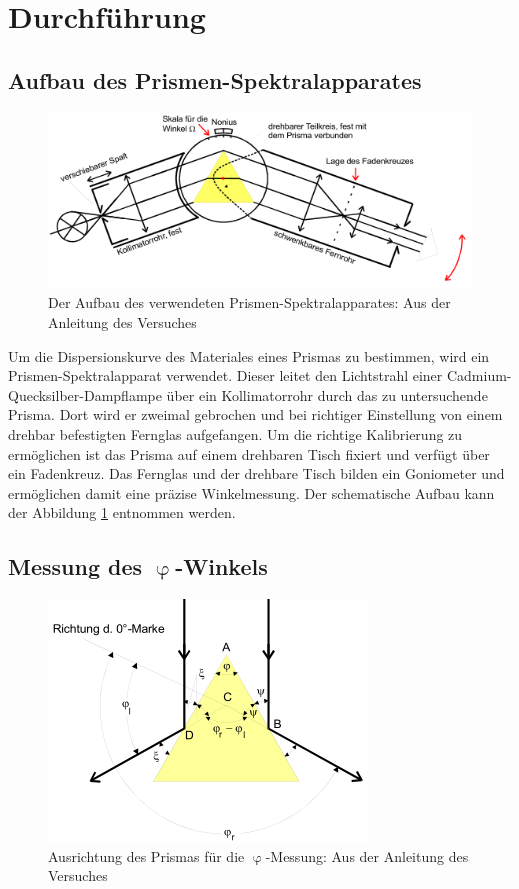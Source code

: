 \section{Durchführung}
\label{sec:Durchführung}
\subsection{Aufbau des Prismen-Spektralapparates}

\begin{figure}
  \centering
  \includegraphics[scale=0.7]{images/Aufbau.png}
  \caption{Der Aufbau des verwendeten Prismen-Spektralapparates: Aus der Anleitung des Versuches \cite[24]{1}}
  \label{fig:aufbau}
\end{figure}

Um die Dispersionskurve des Materiales eines Prismas zu bestimmen, wird ein Prismen-Spektralapparat verwendet.
Dieser leitet den Lichtstrahl einer Cadmium-Quecksilber-Dampflampe über ein Kollimatorrohr durch das zu untersuchende Prisma.
Dort wird er zweimal gebrochen und bei richtiger Einstellung von einem drehbar befestigten Fernglas aufgefangen.
Um die richtige Kalibrierung zu ermöglichen ist das Prisma auf einem drehbaren Tisch fixiert und verfügt über ein Fadenkreuz.
Das Fernglas und der drehbare Tisch bilden ein Goniometer und ermöglichen damit eine präzise Winkelmessung.
Der schematische Aufbau kann der Abbildung \ref{fig:aufbau} entnommen werden.

\subsection{Messung des \texorpdfstring{$\upvarphi$}{phi}-Winkels}

\begin{figure}[H]
  \centering
  \includegraphics[scale=0.6]{images/Phi.png}
  \caption{Ausrichtung des Prismas für die $\upvarphi$-Messung: Aus der Anleitung des Versuches \cite[26]{1}}
  \label{fig:Phi}
\end{figure}

